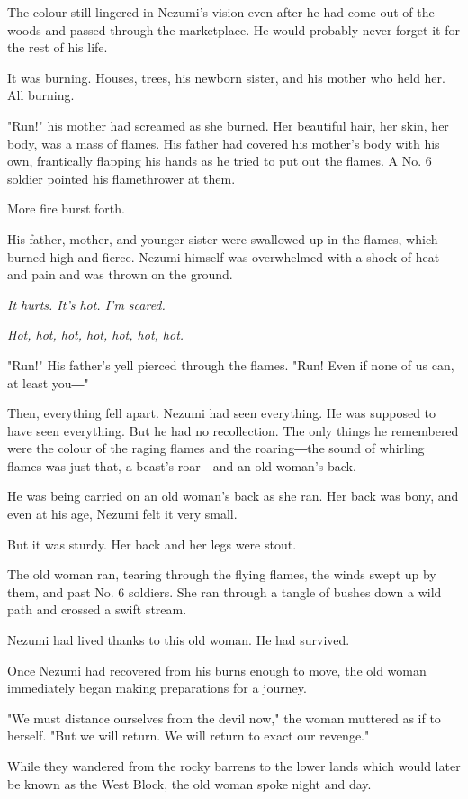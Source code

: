 The colour still lingered in Nezumi's vision even after he had come out
of the woods and passed through the marketplace. He would probably never
forget it for the rest of his life.

It was burning. Houses, trees, his newborn sister, and his mother who
held her. All burning.

"Run!" his mother had screamed as she burned. Her beautiful hair, her
skin, her body, was a mass of flames. His father had covered his
mother's body with his own, frantically flapping his hands as he tried
to put out the flames. A No. 6 soldier pointed his flamethrower at them.

More fire burst forth.

His father, mother, and younger sister were swallowed up in the flames,
which burned high and fierce. Nezumi himself was overwhelmed with a
shock of heat and pain and was thrown on the ground.

\emph{It hurts. It's hot. I'm scared.}

\emph{Hot, hot, hot, hot, hot, hot, hot.}

"Run!" His father's yell pierced through the flames. "Run! Even if none
of us can, at least you―"

Then, everything fell apart. Nezumi had seen everything. He was supposed
to have seen everything. But he had no recollection. The only things he
remembered were the colour of the raging flames and the roaring―the
sound of whirling flames was just that, a beast's roar―and an old
woman's back.

He was being carried on an old woman's back as she ran. Her back was
bony, and even at his age, Nezumi felt it very small.~

But it was sturdy. Her back and her legs were stout.

The old woman ran, tearing through the flying flames, the winds swept up
by them, and past No. 6 soldiers. She ran through a tangle of bushes
down a wild path and crossed a swift stream.

Nezumi had lived thanks to this old woman. He had survived.

Once Nezumi had recovered from his burns enough to move, the old woman
immediately began making preparations for a journey.

"We must distance ourselves from the devil now," the woman muttered as
if to herself. "But we will return. We will return to exact our
revenge."

While they wandered from the rocky barrens to the lower lands which
would later be known as the West Block, the old woman spoke night and
day.

